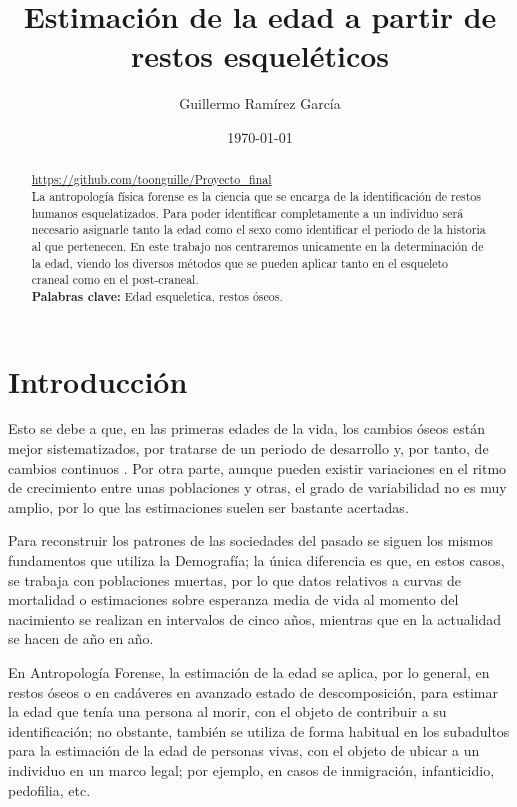 \documentclass[a4paper,11pt]{article}
\begin{document}
\renewcommand{\citeleft}{(}
\renewcommand{\citeright}{)}
\title{\Huge Estimación de la edad a partir de restos esqueléticos}
\author{Guillermo Ramírez García}
\date{\today}
\maketitle
\begin{abstract}
\url{https://github.com/toonguille/Proyecto_final}\\
La antropología física forense es la ciencia que se encarga de la identificación de restos humanos esquelatizados. Para poder identificar completamente a un individuo será necesario asignarle tanto la edad como el sexo como identificar el periodo de la historia al que pertenecen.  En este trabajo nos centraremos unicamente en la determinación de la edad, viendo los diversos métodos que se pueden aplicar tanto en el esqueleto craneal como en el post-craneal.\\
{\scriptsize {\bf Palabras clave:} Edad esqueletica, restos óseos.}
\end{abstract}
\newpage
{}
\part{Introducción}
Esto se debe a que, en las primeras edades de la vida, los cambios óseos están mejor sistematizados, por tratarse de un periodo de desarrollo y, por tanto, de cambios continuos \cite{scheuer2004juvenile}. Por otra parte, aunque pueden existir variaciones en el ritmo de crecimiento entre unas poblaciones y otras, el grado de variabilidad no es muy amplio, por lo que las estimaciones suelen ser bastante acertadas.

Para reconstruir los patrones de las sociedades del pasado se siguen los mismos fundamentos que utiliza la Demografía; la única diferencia es que, en estos casos, se trabaja con poblaciones muertas, por lo que datos relativos a curvas de mortalidad o estimaciones sobre esperanza media de vida al momento del nacimiento se realizan en intervalos de cinco años, mientras que en la actualidad se hacen de año en año.

En Antropología Forense, la estimación de la edad se aplica, por lo general, en restos óseos o en cadáveres en avanzado estado de descomposición, para estimar la edad que tenía una persona al morir, con el objeto de contribuir a su identificación; no obstante, también se utiliza de forma habitual en los subadultos para la estimación de la edad de personas vivas, con el objeto de ubicar a un individuo en un marco legal; por ejemplo, en casos de inmigración, infanticidio, pedofilia, etc.
            
\end{document}
